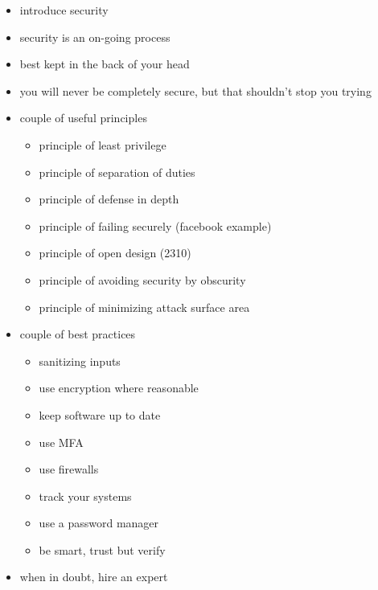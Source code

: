 \begin{drafting}
\begin{itemize}
    \item introduce security
    \item security is an on-going process
    \item best kept in the back of your head
    \item you will never be completely secure, but that shouldn't stop you trying
    \item couple of useful principles
    \begin{itemize}
        \item principle of least privilege
        \item principle of separation of duties
        \item principle of defense in depth
        \item principle of failing securely (facebook example)
        \item principle of open design (2310)
        \item principle of avoiding security by obscurity
        \item principle of minimizing attack surface area
    \end{itemize}
    \item couple of best practices
    \begin{itemize}
        \item sanitizing inputs
        \item use encryption where reasonable
        \item keep software up to date
        \item use MFA
        \item use firewalls
        \item track your systems
        \item use a password manager
        \item be smart, trust but verify
    \end{itemize}
    \item when in doubt, hire an expert
\end{itemize}
\end{drafting}
